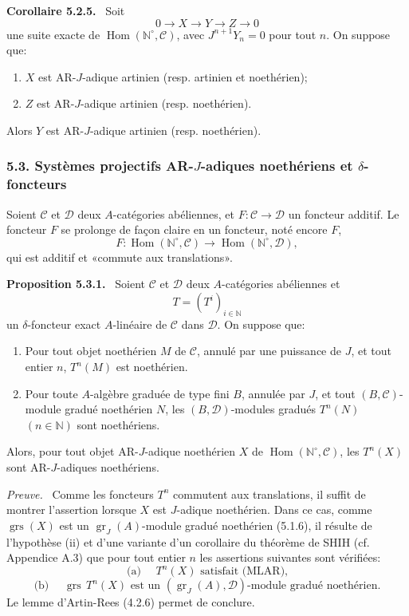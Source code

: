 \documentclass[11pt]{article}
\newenvironment{statement}[1]{\par\medskip\noindent\textbf{#1.}\ }{\par\medskip}
\newenvironment{prooftext}[1][Proof]{\par\noindent\emph{#1.}\ }{\par\medskip}
\DeclareMathOperator{\Hom}{Hom}
\providecommand{\gr}{\operatorname{gr}}
\providecommand{\Hom}{\operatorname{Hom}}
\providecommand{\gr}{\operatorname{gr}}
\providecommand{\gr}{\operatorname{gr}}
\providecommand{\grs}{\operatorname{grs}}
\providecommand{\Hom}{\operatorname{Hom}}
\begin{document}
\begin{statement}{Corollaire 5.2.5}
Soit
\[
0\longrightarrow X\longrightarrow Y\longrightarrow Z\longrightarrow0
\]
une suite exacte de \(\Hom(\mathbb N^\circ,\mathcal C)\), avec \(J^{n+1}Y_n=0\) pour tout \(n\). On suppose que:
\begin{enumerate}[label=\textup{(\roman*)}]
\item \(X\) est AR-\(J\)-adique artinien (resp. artinien et noethérien);
\item \(Z\) est AR-\(J\)-adique artinien (resp. noethérien).
\end{enumerate}
Alors \(Y\) est AR-\(J\)-adique artinien (resp. noethérien).
\end{statement}

\subsubsection*{5.3. Systèmes projectifs AR-\(J\)-adiques noethériens et \(\delta\)-foncteurs}

Soient \(\mathcal C\) et \(\mathcal D\) deux \(A\)-catégories abéliennes, et \(F:\mathcal C\to\mathcal D\) un foncteur additif. Le foncteur \(F\) se prolonge de façon claire en un foncteur, noté encore \(F\),
\[
F:\Hom(\mathbb N^\circ,\mathcal C)\longrightarrow\Hom(\mathbb N^\circ,\mathcal D),
\]
qui est additif et «commute aux translations».

\begin{statement}{Proposition 5.3.1}
Soient \(\mathcal C\) et \(\mathcal D\) deux \(A\)-catégories abéliennes et
\[
T=(T^i)_{i\in\mathbb N}
\]
un \(\delta\)-foncteur exact \(A\)-linéaire de \(\mathcal C\) dans \(\mathcal D\). On suppose que:
\begin{enumerate}[label=\textup{(\roman*)}]
\item Pour tout objet noethérien \(M\) de \(\mathcal C\), annulé par une puissance de \(J\), et tout entier \(n\), \(T^n(M)\) est noethérien.
\item Pour toute \(A\)-algèbre graduée de type fini \(B\), annulée par \(J\), et tout \((B,\mathcal C)\)-module gradué noethérien \(N\), les \((B,\mathcal D)\)-modules gradués \(T^n(N)\) \((n\in\mathbb N)\) sont noethériens.
\end{enumerate}
Alors, pour tout objet AR-\(J\)-adique noethérien \(X\) de \(\Hom(\mathbb N^\circ,\mathcal C)\), les \(T^n(X)\) sont AR-\(J\)-adiques noethériens.
\end{statement}

\begin{prooftext}[Preuve]
Comme les foncteurs \(T^n\) commutent aux translations, il suffit de montrer l'assertion lorsque \(X\) est \(J\)-adique noethérien. Dans ce cas, comme \(\grs(X)\) est un \(\gr_J(A)\)-module gradué noethérien (5.1.6), il résulte de l'hypothèse (ii) et d'une variante d'un corollaire du théorème de SHIH (cf. Appendice A.3) que pour tout entier \(n\) les assertions suivantes sont vérifiées:
\[
\text{(a) }\quad T^n(X)\text{ satisfait (MLAR),}
\]
\[
\text{(b) }\quad \grs\,T^n(X)\text{ est un }(\gr_J(A),\mathcal D)\text{-module gradué noethérien.}
\]
Le lemme d'Artin-Rees (4.2.6) permet de conclure.
\end{prooftext}
\end{document}

